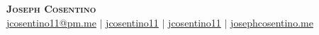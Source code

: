 \documentclass[letterpaper,11pt]{article}
\begin{document}

\begin{center}
    \textbf{\Huge \scshape Joseph Cosentino} \\ \vspace{3pt}
    \small
    \faAt \hspace{.5pt} \href{mailto:jcosentino11@pm.me}{jcosentino11@pm.me}
    $|$
    \faLinkedinSquare \hspace{.5pt} \href{https://www.linkedin.com/in/jcosentino11}{jcosentino11}
    $|$
    \faGithub \hspace{.5pt} \href{https://github.com/jcosentino11}{jcosentino11}
    $|$
    \faGlobe \hspace{.5pt} \href{https://josephcosentino.me}{josephcosentino.me}
\end{center}

\end{document}
